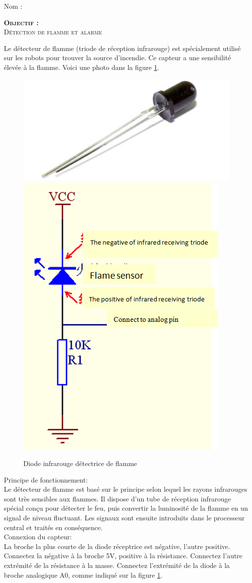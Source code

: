 \documentclass[a4paper, 11pt]{article}           %
\newcommand{\objectif}[1]{\textsc{\huge \textbf{Objectif :}\\[2mm] #1} }
\begin{document}
\sffamily
\hfill Nom : {\noindent\makebox[5cm]{\dotfill}\endgraf}

\objectif{Détection de flamme et alarme}

Le détecteur de flamme (triode de réception infrarouge) est spécialement utilisé sur les robots pour trouver la source d'incendie. Ce capteur a une sensibilité élevée à la flamme. Voici une photo dans la figure \ref{FigDiodeFlamme}.
\begin{figure}[!h]
	\begin{center}
		\includegraphics[width=.5\textwidth]{detecteur_flamme}
		\includegraphics[width=.3\textwidth]{DiodeCircuit}
		\caption{Diode infrarouge détectrice de flamme}
		\label{FigDiodeFlamme}
	\end{center}
\end{figure}


Principe de fonctionnement:\\
Le détecteur de flamme est basé sur le principe selon lequel les rayons infrarouges sont très sensibles aux flammes. Il dispose d'un tube de réception infrarouge spécial conçu pour détecter le feu, puis convertir la luminosité de la flamme en un signal de niveau fluctuant. Les signaux sont ensuite introduits dans le processeur central et traités en conséquence.\\

Connexion du capteur:\\
La broche la plus courte de la diode réceptrice est négative, l'autre positive. Connectez la négative à la broche 5V, positive à la résistance. Connectez l'autre extrémité de la résistance à la masse. Connectez l'extrémité de la diode à la broche analogique A0, comme indiqué sur la figure \ref{FigDiodeFlamme}.\\
\end{document}
